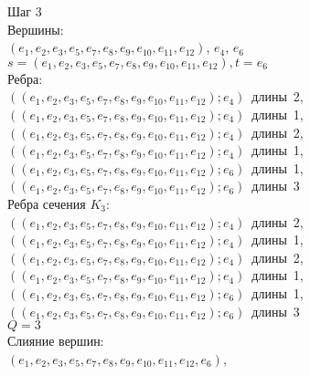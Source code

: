 \documentclass[a4paper,12pt]{article}
\begin{document}
\bigskip
\noindent
\begin{minipage}{\textwidth}
Шаг 3\\
Вершины:\\
\mbox{$(e_{1},e_{2},e_{3},e_{5},e_{7},e_{8},e_{9},e_{10},e_{11},e_{12})$},
\mbox{$e_{4}$},
\mbox{$e_{6}$}\\
\mbox{$s=(e_{1},e_{2},e_{3},e_{5},e_{7},e_{8},e_{9},e_{10},e_{11},e_{12}),t=e_{6}$}\\
Ребра:\\
\mbox{$((e_{1},e_{2},e_{3},e_{5},e_{7},e_{8},e_{9},e_{10},e_{11},e_{12});e_{4})$ длины 2},
\mbox{$((e_{1},e_{2},e_{3},e_{5},e_{7},e_{8},e_{9},e_{10},e_{11},e_{12});e_{4})$ длины 1},
\mbox{$((e_{1},e_{2},e_{3},e_{5},e_{7},e_{8},e_{9},e_{10},e_{11},e_{12});e_{4})$ длины 2},
\mbox{$((e_{1},e_{2},e_{3},e_{5},e_{7},e_{8},e_{9},e_{10},e_{11},e_{12});e_{4})$ длины 1},
\mbox{$((e_{1},e_{2},e_{3},e_{5},e_{7},e_{8},e_{9},e_{10},e_{11},e_{12});e_{6})$ длины 1},
\mbox{$((e_{1},e_{2},e_{3},e_{5},e_{7},e_{8},e_{9},e_{10},e_{11},e_{12});e_{6})$ длины 3}\\
Ребра сечения $K_{3}$:\\
\mbox{$((e_{1},e_{2},e_{3},e_{5},e_{7},e_{8},e_{9},e_{10},e_{11},e_{12});e_{4})$ длины 2},
\mbox{$((e_{1},e_{2},e_{3},e_{5},e_{7},e_{8},e_{9},e_{10},e_{11},e_{12});e_{4})$ длины 1},
\mbox{$((e_{1},e_{2},e_{3},e_{5},e_{7},e_{8},e_{9},e_{10},e_{11},e_{12});e_{4})$ длины 2},
\mbox{$((e_{1},e_{2},e_{3},e_{5},e_{7},e_{8},e_{9},e_{10},e_{11},e_{12});e_{4})$ длины 1},
\mbox{$((e_{1},e_{2},e_{3},e_{5},e_{7},e_{8},e_{9},e_{10},e_{11},e_{12});e_{6})$ длины 1},
\mbox{$((e_{1},e_{2},e_{3},e_{5},e_{7},e_{8},e_{9},e_{10},e_{11},e_{12});e_{6})$ длины 3}\\
$Q=3$\\
Слияние вершин:\\
\mbox{$(e_{1},e_{2},e_{3},e_{5},e_{7},e_{8},e_{9},e_{10},e_{11},e_{12},e_{6})$},
\end{minipage}

\label{LastPage}
\end{document}
